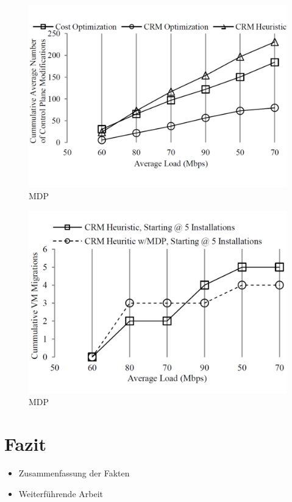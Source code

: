 \documentclass[conference]{IEEEtran}
\begin{document}
\begin{figure}[h!]
	\centering
	\includegraphics[trim=0 3cm 0 1cm,scale=0.25]{grafik/CPM.pdf}
	\caption{MDP}
	\label{img:CPM}
\end{figure}

\begin{figure}[h!]
	\centering
	\includegraphics[trim=0 3cm 0 1cm,scale=0.25]{grafik/MDP.pdf}
	\caption{MDP}
	\label{img:MDP}
\end{figure}



\section{Fazit}
\begin{itemize}
\item Zusammenfassung der Fakten
\item Weiterführende Arbeit
\end{itemize}
\end{document}
